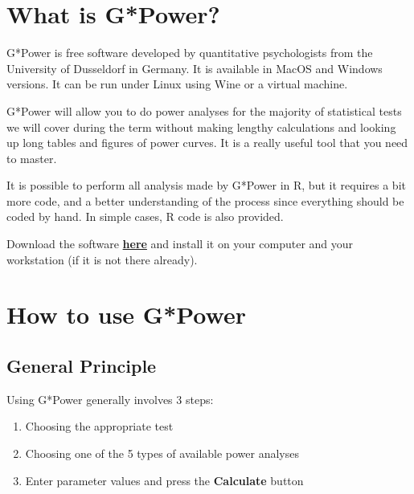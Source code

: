 \documentclass[
  12pt,
]{book}
\makeatletter
\providecommand{\tightlist}{%
  \setlength{\itemsep}{0pt}\setlength{\parskip}{0pt}}
\newenvironment{kframe}{%
\medskip{}
\setlength{\fboxsep}{.8em}
\def\at@end@of@kframe{}%
\ifinner\ifhmode%
 \def\at@end@of@kframe{\end{minipage}}%
 \begin{minipage}{\columnwidth}%
\fi\fi%
\def\FrameCommand##1{\hskip\@totalleftmargin \hskip-\fboxsep
\colorbox{incolor}{##1}\hskip-\fboxsep
    \hskip-\linewidth \hskip-\@totalleftmargin \hskip\columnwidth}%
\MakeFramed {\advance\hsize-\width
  \@totalleftmargin\z@ \linewidth\hsize
  \@setminipage}}%
{\par\unskip\endMakeFramed%
\at@end@of@kframe}
\newenvironment{rmdblock}[1]
 {
 \begin{itemize}
 \renewcommand{\labelitemi}{
   \raisebox{-.7\height}[0pt][0pt]{
     {\setkeys{Gin}{width=3em,keepaspectratio}\texttt{[image: images/\#1]}}
   }
 }
 \begin{kframe}
 \setlength{\fboxsep}{1em}
 \item
 }
 {
 \end{kframe}
 \end{itemize}
 }
\newenvironment{rmdcode}
  {\begin{rmdblock}{screen}}
  {\end{rmdblock}}
\makeatother
\begin{document}
\hypertarget{what-is-gpower}{%
\section{What is G*Power?}\label{what-is-gpower}}

G*Power is free software developed by quantitative psychologists from the University of Dusseldorf in Germany.
It is available in MacOS and Windows versions.
It can be run under Linux using Wine or a virtual machine.

G*Power will allow you to do power analyses for the majority of statistical tests we will cover during the term without making lengthy calculations and looking up long tables and figures of power curves. It is a really useful tool that you need to master.

It is possible to perform all analysis made by G*Power in R, but it requires a bit more code, and a better understanding of the process since everything should be coded by hand. In simple cases, R code is also provided.

\begin{rmdcode}
Download the software \textbf{\href{https://www.psychologie.hhu.de/arbeitsgruppen/allgemeine-psychologie-und-arbeitspsychologie/gpower.html}{here}} and install it on your computer and your workstation (if it is not there already).
\end{rmdcode}

\hypertarget{how-to-use-gpower}{%
\section{How to use G*Power}\label{how-to-use-gpower}}

\hypertarget{general-principle}{%
\subsection{General Principle}\label{general-principle}}

Using G*Power generally involves 3 steps:

\begin{enumerate}
\def\labelenumi{\arabic{enumi}.}
\tightlist
\item
  Choosing the appropriate test
\item
  Choosing one of the 5 types of available power analyses
\item
  Enter parameter values and press the \textbf{Calculate} button
\end{enumerate}
\end{document}
